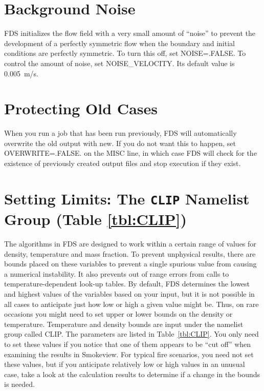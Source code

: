 \documentclass[11pt]{book}
\begin{document}
\section{Background Noise}
\label{info:NOISE}

FDS initializes the flow field with a very small amount of ``noise'' to prevent the development of a perfectly symmetric flow when the boundary and initial conditions are perfectly symmetric. To turn this off, set {\ct NOISE=.FALSE.} To control the amount of noise, set {\ct NOISE\_VELOCITY}. Its default value is 0.005~m/s.



\section{Protecting Old Cases}
\label{info:OVERWRITE}

When you run a job that has been run previously, FDS will automatically overwrite the old output with new. If you do not want this to happen, set {\ct OVERWRITE=.FALSE.} on the {\ct MISC} line, in which case FDS will check for the existence of previously created output files and stop execution if they exist.



\section{Setting Limits: The \texorpdfstring{{\tt CLIP}}{CLIP} Namelist Group (Table \ref{tbl:CLIP})}
\label{info:CLIP}

The algorithms in FDS are designed to work within a certain range of values for density, temperature and mass fraction. To prevent unphysical results, there are bounds placed on these variables to prevent a single spurious value from causing a numerical instability. It also prevents out of range errors from calls to temperature-dependent look-up tables. By default, FDS determines the lowest and highest values of the variables based on your input, but it is not possible in all cases to anticipate just how low or high a given value might be. Thus, on rare occasions you might need to set upper or lower bounds on the density or temperature. Temperature and density bounds are input under the namelist group called {\ct CLIP}. The parameters are listed in Table~\ref{tbl:CLIP}. You only need to set these values if you notice that one of them appears to be ``cut off'' when examining the results in Smokeview. For typical fire scenarios, you need not set these values, but if you anticipate relatively low or high values in an unusual case, take a look at the calculation results to determine if a change in the bounds is needed.
\end{document}

